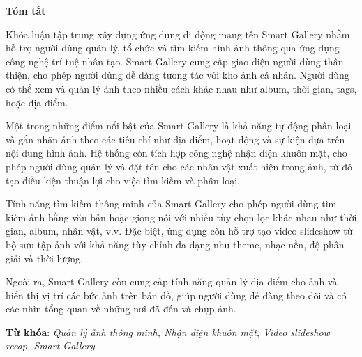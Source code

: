 \begin{center}
\textbf{\large{Tóm tắt}	}
\end{center}


\begin{small}
    Khóa luận tập trung xây dựng ứng dụng di động mang tên Smart Gallery nhằm hỗ trợ người dùng quản lý, tổ chức và tìm kiếm hình ảnh thông qua ứng dụng công nghệ trí tuệ nhân tạo. Smart Gallery cung cấp giao diện người dùng thân thiện, cho phép người dùng dễ dàng tương tác với kho ảnh cá nhân. Người dùng có thể xem và quản lý ảnh theo nhiều cách khác nhau như album, thời gian, tags, hoặc địa điểm.

    Một trong những điểm nổi bật của Smart Gallery là khả năng tự động phân loại và gắn nhãn ảnh theo các tiêu chí như địa điểm, hoạt động và sự kiện dựa trên nội dung hình ảnh. Hệ thống còn tích hợp công nghệ nhận diện khuôn mặt, cho phép người dùng quản lý và đặt tên cho các nhân vật xuất hiện trong ảnh, từ đó tạo điều kiện thuận lợi cho việc tìm kiếm và phân loại.
    
    Tính năng tìm kiếm thông minh của Smart Gallery cho phép người dùng tìm kiếm ảnh bằng văn bản hoặc giọng nói với nhiều tùy chọn lọc khác nhau như thời gian, album, nhân vật, v.v. Đặc biệt, ứng dụng còn hỗ trợ tạo video slideshow từ bộ sưu tập ảnh với khả năng tùy chỉnh đa dạng như theme, nhạc nền, độ phân giải và thời lượng.
    
    Ngoài ra, Smart Gallery còn cung cấp tính năng quản lý địa điểm cho ảnh và hiển thị vị trí các bức ảnh trên bản đồ, giúp người dùng dễ dàng theo dõi và có các nhìn tổng quan về những nơi đã đến và chụp ảnh.


\vspace*{1cm}
\textbf{Từ khóa}: 
\textit{Quản lý ảnh thông minh, Nhận diện khuôn mặt, Video slideshow recap, Smart Gallery}
\end{small}